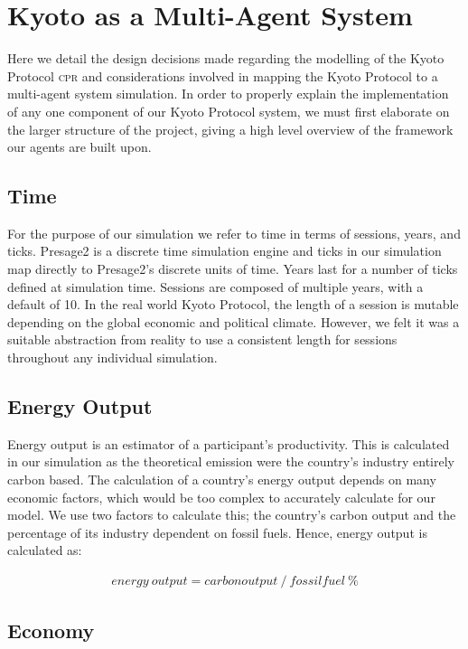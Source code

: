 \section{Kyoto as a Multi-Agent System}

Here we detail the design decisions made regarding the modelling of the Kyoto Protocol \textsc{cpr} and considerations involved in mapping the Kyoto Protocol to a multi-agent system simulation. In order to properly explain the implementation of any one component of our Kyoto Protocol system, we must first elaborate on the larger structure of the project, giving a high level overview of the framework our agents are built upon.

\subsection{Time}

For the purpose of our simulation we refer to time in terms of sessions, years, and ticks. Presage2 is a discrete time simulation engine and ticks in our simulation map directly to Presage2's discrete units of time. Years last for a number of ticks defined at simulation time. Sessions are composed of multiple years, with a default of 10. In the real world Kyoto Protocol, the length of a session is mutable depending on the global economic and political climate. However, we felt it was a suitable abstraction from reality to use a consistent length for sessions throughout any individual simulation.

\subsection{Energy Output}

Energy output is an estimator of a participant's productivity. This is calculated in our simulation as the theoretical \CO emission were the country's industry entirely carbon based. The calculation of a country's energy output depends on many economic factors, which would be too complex to accurately calculate for our model. We use two factors to calculate this; the country's carbon output and the percentage of its industry dependent on fossil fuels. Hence, energy output is calculated as: 

\begin{align*}
energy~output = carbon output~/~fossil fuel~\%
\end{align*}

\subsection{Economy}

